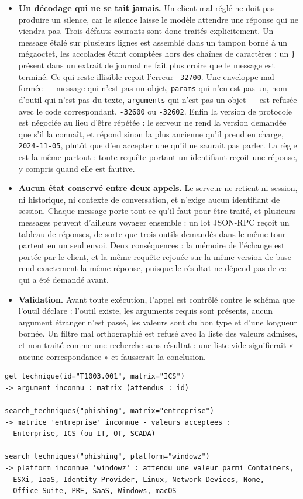 \begin{itemize}
\tightlist
\item
  \textbf{Un décodage qui ne se tait jamais.} Un client mal réglé ne doit pas produire un silence, car le silence laisse le modèle attendre une réponse qui ne viendra pas. Trois défauts courants sont donc traités explicitement. Un message étalé sur plusieurs lignes est assemblé dans un tampon borné à un mégaoctet, les accolades étant comptées hors des chaînes de caractères : un \texttt{\}} présent dans un extrait de journal ne fait plus croire que le message est terminé. Ce qui reste illisible reçoit l'erreur \texttt{-32700}. Une enveloppe mal formée --- message qui n'est pas un objet, \texttt{params} qui n'en est pas un, nom d'outil qui n'est pas du texte, \texttt{arguments} qui n'est pas un objet --- est refusée avec le code correspondant, \texttt{-32600} ou \texttt{-32602}. Enfin la version de protocole est négociée au lieu d'être répétée : le serveur ne rend la version demandée que s'il la connaît, et répond sinon la plus ancienne qu'il prend en charge, \texttt{2024-11-05}, plutôt que d'en accepter une qu'il ne saurait pas parler. La règle est la même partout : toute requête portant un identifiant reçoit une réponse, y compris quand elle est fautive.
\item
  \textbf{Aucun état conservé entre deux appels.} Le serveur ne retient ni session, ni historique, ni contexte de conversation, et n'exige aucun identifiant de session. Chaque message porte tout ce qu'il faut pour être traité, et plusieurs messages peuvent d'ailleurs voyager ensemble : un lot JSON-RPC reçoit un tableau de réponses, de sorte que trois outils demandés dans le même tour partent en un seul envoi. Deux conséquences : la mémoire de l'échange est portée par le client, et la même requête rejouée sur la même version de base rend exactement la même réponse, puisque le résultat ne dépend pas de ce qui a été demandé avant.
\item
  \textbf{Validation.} Avant toute exécution, l'appel est contrôlé contre le schéma que l'outil déclare : l'outil existe, les arguments requis sont présents, aucun argument étranger n'est passé, les valeurs sont du bon type et d'une longueur bornée. Un filtre mal orthographié est refusé avec la liste des valeurs admises, et non traité comme une recherche sans résultat : une liste vide signifierait « aucune correspondance » et fausserait la conclusion.
\end{itemize}

\begin{verbatim}
get_technique(id="T1003.001", matrix="ICS")
-> argument inconnu : matrix (attendus : id)

search_techniques("phishing", matrix="entreprise")
-> matrice 'entreprise' inconnue - valeurs acceptees :
  Enterprise, ICS (ou IT, OT, SCADA)

search_techniques("phishing", platform="windowz")
-> platform inconnue 'windowz' : attendu une valeur parmi Containers,
  ESXi, IaaS, Identity Provider, Linux, Network Devices, None,
  Office Suite, PRE, SaaS, Windows, macOS
\end{verbatim}

